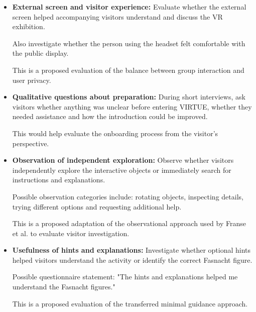 \begin{itemize}
    Possible questionnaire statement:
    "I had enough time to readjust after removing
    the VR headset."

    This question is derived from Whittaker's
    discussion of offboarding.
    \cite[pp.~97--98]{whittaker_onboarding_2025}

    \item \textbf{External screen and visitor experience:}
    Evaluate whether the external screen helped
    accompanying visitors understand and discuss
    the VR exhibition.

    Also investigate whether the person using the
    headset felt comfortable with the public display.

    This is a proposed evaluation of the balance
    between group interaction and user privacy.
    \cite[pp.~89--91]{whittaker_onboarding_2025}

    \item \textbf{Qualitative questions about preparation:}
    During short interviews, ask visitors whether
    anything was unclear before entering VIRTUE,
    whether they needed assistance and how the
    introduction could be improved.

    This would help evaluate the onboarding process
    from the visitor's perspective.
    \cite[pp.~101--102]{whittaker_onboarding_2025}

    \item \textbf{Observation of independent exploration:}
    Observe whether visitors independently explore
    the interactive objects or immediately search
    for instructions and explanations.

    Possible observation categories include:
    rotating objects, inspecting details, trying
    different options and requesting additional help.

    This is a proposed adaptation of the observational
    approach used by Franse et al. to evaluate
    visitor investigation.
    \cite[pp.~713--718]{franse_families_2021}

    \item \textbf{Usefulness of hints and explanations:}
    Investigate whether optional hints helped visitors
    understand the activity or identify the correct
    Fasnacht figure.

    Possible questionnaire statement:
    "The hints and explanations helped me understand
    the Fasnacht figures."

    This is a proposed evaluation of the transferred
    minimal guidance approach.
    \cite[pp.~727,~733--734]{franse_families_2021}


\end{itemize}
